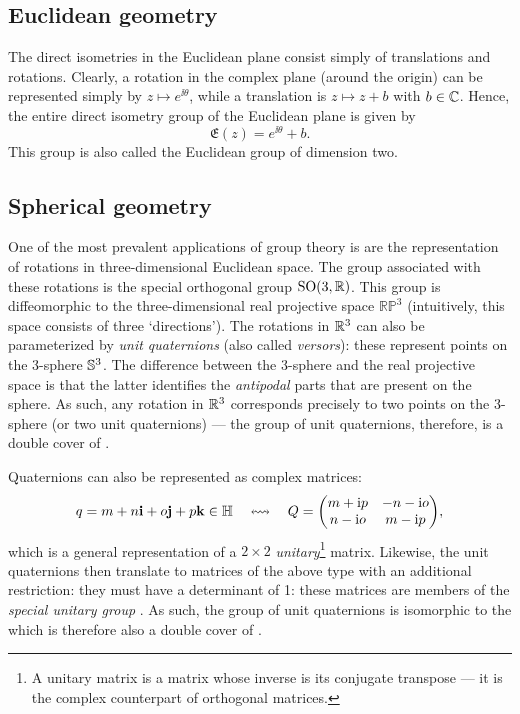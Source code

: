 \subsection{Euclidean geometry}
The direct isometries in the Euclidean plane consist simply of translations and rotations. Clearly, a rotation in the complex plane (around the origin) can be represented simply by \(z \mapsto e^{\ii \theta}\), while a translation is \(z \mapsto z + b\) with \(b \in \mathbb{C}\). Hence, the entire direct isometry group of the Euclidean plane is given by
    \[ \mathfrak{E}(z) = e^{\ii\theta} + b. \]
This group is also called the Euclidean group of dimension two.
\subsection{Spherical geometry}
One of the most prevalent applications of group theory is are the representation of rotations in three-dimensional Euclidean space. The group associated with these rotations is the special orthogonal group \(\mathrm{SO}(3, \mathbb{R})\). This group is diffeomorphic to the three-dimensional real projective space \(\mathbb{RP}^3\) (intuitively, this space consists of three `directions'). The rotations in \(\mathbb{R}^3\) can also be parameterized by \emph{unit quaternions} (also called \emph{versors}): these represent points on the 3-sphere \(\mathbb{S}^{3}\). The difference between the 3-sphere and the real projective space is that the latter identifies the \emph{antipodal} parts that are present on the sphere. As such, any rotation in \(\mathbb{R}^3\) corresponds precisely to two points on the 3-sphere (or two unit quaternions) --- the group of unit quaternions, therefore, is a double cover of \sogroup. 

Quaternions can also be represented as complex matrices: \cite{Stillwell2008}
\[ q = \quat{m}{n}{o}{p} \in \quaternions \corresponds Q = \mqty(m + \ii p & -n - \ii o\\n - \ii o & m - \ii p),\]
which is a general representation of a \(2\times 2\) \emph{unitary}\footnote{A unitary matrix is a matrix whose inverse is its conjugate transpose --- it is the complex counterpart of orthogonal matrices.} matrix. Likewise, the unit quaternions then translate to matrices of the above type with an additional restriction: they must have a determinant of 1: these matrices are members of the \emph{special unitary group} . As such, the group of unit quaternions is isomorphic to the  which is therefore also a double cover of \sogroup.

